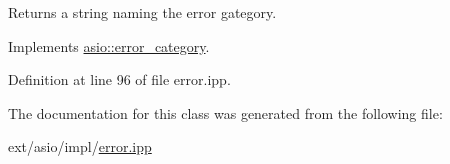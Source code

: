Returns a string naming the error gategory. 



Implements \hyperlink{classasio_1_1error__category_a556b6099e1cc2d1cfb22e4ef2c9b0947}{asio\+::error\+\_\+category}.



Definition at line 96 of file error.\+ipp.



The documentation for this class was generated from the following file\+:\begin{DoxyCompactItemize}
\item 
ext/asio/impl/\hyperlink{impl_2error_8ipp}{error.\+ipp}\end{DoxyCompactItemize}
